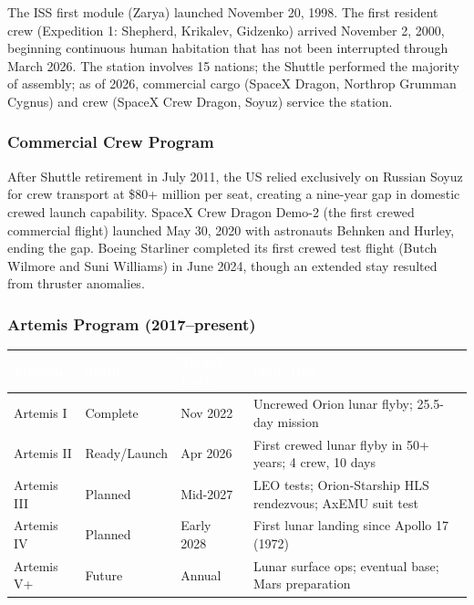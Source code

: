 \documentclass[11pt,letterpaper]{article}
\newcommand{\tableheader}[1]{\textbf{\sffamily\textcolor{white}{#1}}}
\begin{document}
The ISS first module (Zarya) launched November 20, 1998. The first resident crew (Expedition 1: Shepherd, Krikalev, Gidzenko) arrived November 2, 2000, beginning continuous human habitation that has not been interrupted through March 2026. The station involves 15 nations; the Shuttle performed the majority of assembly; as of 2026, commercial cargo (SpaceX Dragon, Northrop Grumman Cygnus) and crew (SpaceX Crew Dragon, Soyuz) service the station.

\subsubsection{Commercial Crew Program}

After Shuttle retirement in July 2011, the US relied exclusively on Russian Soyuz for crew transport at \$80+ million per seat, creating a nine-year gap in domestic crewed launch capability. SpaceX Crew Dragon Demo-2 (the first crewed commercial flight) launched May 30, 2020 with astronauts Behnken and Hurley, ending the gap. Boeing Starliner completed its first crewed test flight (Butch Wilmore and Suni Williams) in June 2024, though an extended stay resulted from thruster anomalies.

\subsubsection{Artemis Program (2017--present)}

\begin{center}
\begin{tabularx}{\textwidth}{L{2.5cm}L{2.5cm}L{2cm}X}
\toprule
{}
\tableheader{Mission} & \tableheader{Status} & \tableheader{Target Date} & \tableheader{Objective} \\
\midrule
Artemis I & Complete & Nov 2022 & Uncrewed Orion lunar flyby; 25.5-day mission \\
Artemis II & Ready/Launch & Apr 2026 & First crewed lunar flyby in 50+ years; 4 crew, 10 days \\
Artemis III & Planned & Mid-2027 & LEO tests; Orion-Starship HLS rendezvous; AxEMU suit test \\
Artemis IV & Planned & Early 2028 & First lunar landing since Apollo 17 (1972) \\
Artemis V+ & Future & Annual & Lunar surface ops; eventual base; Mars preparation \\
\bottomrule
\end{tabularx}
\end{center}
\end{document}
